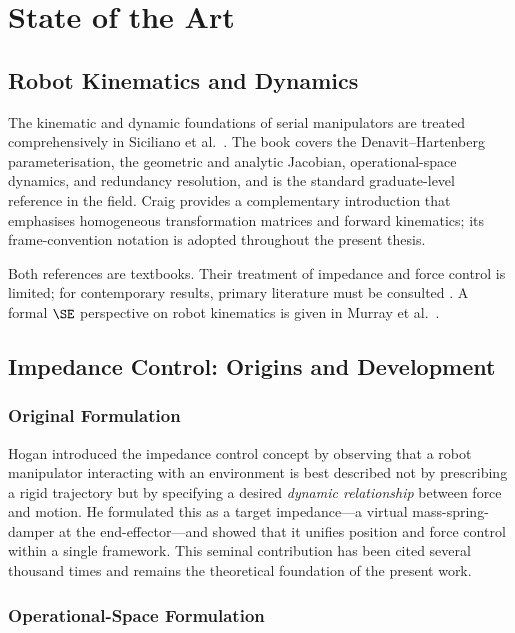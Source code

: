 \chapter{State of the Art}
\label{ch:literature}

\section{Robot Kinematics and Dynamics}
\label{sec:lit_kinematics}

The kinematic and dynamic foundations of serial manipulators are treated
comprehensively in Siciliano et al.\ \cite{Siciliano2009}.
The book covers the Denavit--Hartenberg parameterisation, the geometric
and analytic Jacobian, operational-space dynamics, and redundancy
resolution, and is the standard graduate-level reference in the field.
Craig \cite{Craig2005} provides a complementary introduction that
emphasises homogeneous transformation matrices and forward kinematics;
its frame-convention notation is adopted throughout the present thesis.

Both references are textbooks.
Their treatment of impedance and force control is limited; for
contemporary results, primary literature must be consulted
\cite{Albu2003, Villani2016}.
A formal $\SE$ perspective on robot kinematics is given in
Murray et al.\ \cite{Murray1994}.

\section{Impedance Control: Origins and Development}
\label{sec:lit_impedance}

\subsection{Original Formulation}

Hogan \cite{Hogan1985} introduced the impedance control concept by
observing that a robot manipulator interacting with an environment is
best described not by prescribing a rigid trajectory but by specifying
a desired \emph{dynamic relationship} between force and motion.
He formulated this as a target impedance---a virtual mass-spring-damper
at the end-effector---and showed that it unifies position and force
control within a single framework.
This seminal contribution has been cited several thousand times and
remains the theoretical foundation of the present work.

\subsection{Operational-Space Formulation}


